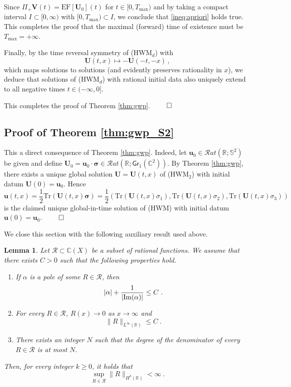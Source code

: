 \documentclass[11pt,reqno]{amsart}
\newtheorem{lem}{Lemma}[section]
\theoremstyle{definition}
\theoremstyle{remark}
\theoremstyle{remark}
\numberwithin{equation}{section}
\newcommand{\C}{\mathbb{C}}
\newcommand{\R}{\mathbb{R}}
\newcommand{\Ss}{\mathbb{S}}
\newcommand{\uu}{\mathbf{u}}
\newcommand{\Vb}{\mathbf{V}}
\newcommand{\Ub}{\mathbf{U}}
\newcommand{\Tr}{\mathrm{Tr}}
\newcommand{\Gr}{\mathsf{Gr}}
\begin{document}
Since $\Pi_+ \Vb(t) = \mathrm{EF}[\Ub_0](t)$ for $t \in [0, T_{\max})$ and by taking a compact interval $I \subset [0,\infty)$ with $[0,T_{\max}) \subset I$, we conclude that \eqref{ineq:apriori} holds true. This completes the proof that the maximal (forward) time of existence must be $T_{\max} = +\infty$. 

Finally, by the time reversal symmetry of (HWM$_d$) with
$$
\Ub(t,x) \mapsto -\Ub(-t,-x) \, ,
$$ 
which maps solutions to solutions (and evidently preserves rationality in $x$), we deduce that solutions of (HWM$_d$) with rational initial data also uniquely extend to all negative times $t \in (-\infty, 0]$. 

This completes the proof of Theorem \ref{thm:gwp}. \hfill $\qed$

\subsection*{Proof of Theorem \ref{thm:gwp_S2}}
This a direct consequence of Theorem \ref{thm:gwp}. Indeed, let $\uu_0 \in \mathcal{R}at(\R; \Ss^2)$ be given and define $\Ub_0 = \uu_0 \cdot \bm{\sigma} \in \mathcal{R}at(\R; \Gr_1(\C^2))$. By Theorem \ref{thm:gwp}, there exists a unique global solution $\Ub = \Ub(t,x)$ of (HWM$_2$) with initial datum $\Ub(0) = \uu_0$. Hence 
$$
\uu(t,x) = \frac{1}{2} \Tr( \Ub(t,x) \bm{\sigma} )=\frac{1}{2} ( \Tr(\Ub(t,x) \sigma_1), \Tr(\Ub(t,x) \sigma_2), \Tr(\Ub(t,x) \sigma_3))
$$ 
is the claimed unique global-in-time solution of (HWM) with initial datum $\uu(0)=\uu_0$. \hfill $\qed$

\medskip
We close this section with the following auxiliary result used above.

\begin{lem} \label{lem:rational_family}
Let $\mathcal R \subset \C(X)$ be a subset of rational functions. We assume that there exists $C>0$ such that the following properties hold.
\begin{enumerate}
\item If $\alpha $ is a pole of some $R\in \mathcal R$, then 
$$|\alpha | +\frac{1}{|{\rm Im}(\alpha )|} \leq C\ .$$
\item For every $R\in \mathcal R$, $R(x)\to  0$ as $x\to \infty $ and 
$$\| R \|_{L^\infty (\R )}\leq C\ .$$
\item There exists an integer $N$ such that the degree of the denominator of every $R\in \mathcal R$ is at most $N$.
\end{enumerate}
Then, for every integer $k\ge 0$, it holds that
$$\sup_{R\in \mathcal R}\| R\|_{H^k(\R )}<\infty \ .$$
\end{lem}
\end{document}
